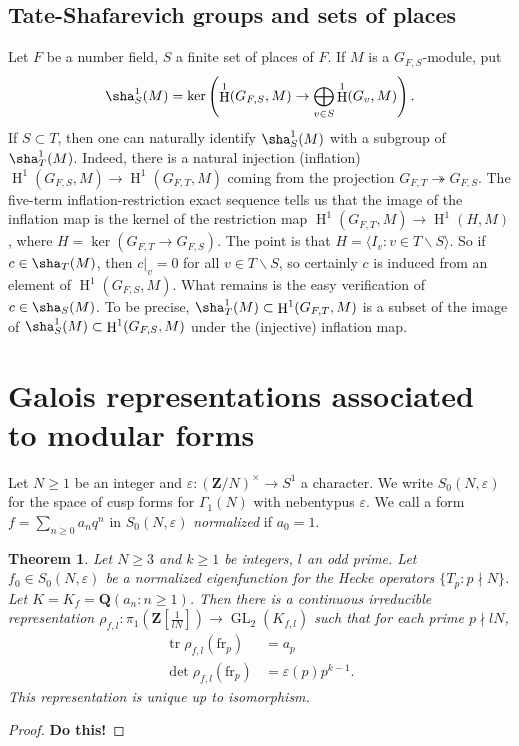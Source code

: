 \documentclass{amsart}
\DeclareMathOperator{\GL}{GL}
\DeclareMathOperator{\h}{H}
\DeclareMathOperator{\trace}{tr}
\newcommand{\dQ}{\mathbf{Q}}
\newcommand{\dZ}{\mathbf{Z}}
\newcommand{\arithfrob}{\mathrm{fr}}
\newtheorem{theorem}[subsection]{Theorem}
\begin{document}
\subsection{Tate-Shafarevich groups and sets of places}

Let $F$ be a number field, $S$ a finite set of places of $F$. If $M$ is a 
$G_{F,S}$-module, put 
\[
  \sha_S^1(M) = \ker\left(\h^1(G_{F,S},M) \to \bigoplus_{v\in S} \h^1(G_v,M)\right) .
\]
If $S\subset T$, then one can naturally identify $\sha_S^1(M)$ with a subgroup of 
$\sha_T^1(M)$. Indeed, there is a natural injection (inflation) 
$\h^1(G_{F,S},M) \to \h^1(G_{F,T},M)$ coming from the projection 
$G_{F,T}\twoheadrightarrow G_{F,S}$. The five-term inflation-restriction exact 
sequence \cite[1.6.7]{nsw08} tells us that the image of the inflation map is 
the kernel of the restriction map $\h^1(G_{F,T},M) \to \h^1(H,M)$, where 
$H=\ker(G_{F,T}\to G_{F,S})$. The point is that 
$H=\langle I_v:v\in T\smallsetminus S\rangle$. So if $c\in \sha_T(M)$, then 
$c|_v=0$ for all $v\in T\smallsetminus S$, so certainly $c$ is induced from 
an element of $\h^1(G_{F,S},M)$. What remains is the easy verification of 
$c\in \sha_S(M)$. To be precise, 
$\sha_T^1(M)\subset \h^1(G_{F,T},M)$ is a subset of the image of 
$\sha_S^1(M)\subset \h^1(G_{F,S},M)$ under the (injective) inflation map. 





\section{Galois representations associated to modular forms}

Let $N\geqslant 1$ be an integer and $\varepsilon:(\dZ/N)^\times \to S^1$ a 
character. We write $S_0(N,\varepsilon)$ for the space of cusp forms for 
$\Gamma_1(N)$ with nebentypus $\varepsilon$. We call a form 
$f=\sum_{n\geqslant 0} a_n q^n$ in $S_0(N,\varepsilon)$ \emph{normalized} if 
$a_0=1$. 

\begin{theorem}
Let $N\geqslant 3$ and $k\geqslant 1$ be integers, $l$ an odd prime. Let 
$f_0\in S_0(N,\varepsilon)$ be a normalized eigenfunction for the Hecke 
operators $\{T_p:p\nmid N\}$. Let $K=K_f=\dQ(a_n:n\geqslant 1)$. 
Then there is a continuous irreducible representation 
$\rho_{f,l}:\pi_1\left(\dZ[\frac{1}{l N}]\right)\to \GL_2(K_{f,l})$ such that 
for each prime $p\nmid l N$, 
\begin{align*}
  \trace \rho_{f,l}(\arithfrob_p) &= a_p \\
  \det \rho_{f,l}(\arithfrob_p) &= \varepsilon(p) p^{k-1} .
\end{align*}
This representation is unique up to isomorphism. 
\end{theorem}
\begin{proof}
\textbf{Do this!}
\end{proof}
\end{document}
